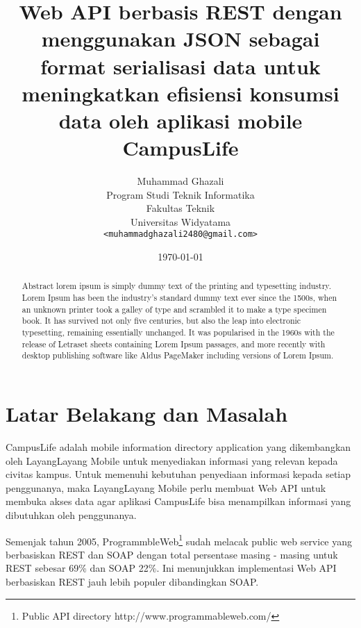 \documentclass[a4paper, 12pt]{report}
\title{\textbf{Web API berbasis REST dengan menggunakan JSON sebagai format serialisasi data untuk meningkatkan efisiensi konsumsi data oleh aplikasi mobile CampusLife}}
\author{
Muhammad Ghazali\\
Program Studi Teknik Informatika\\
Fakultas Teknik\\
Universitas Widyatama
\\ \texttt{<muhammadghazali2480@gmail.com>}
}
\date{\today}
\begin{document}
\maketitle

\tableofcontents
\setcounter{tocdepth}{3}

\listoffigures
\listoftables

\begin{abstract}
Abstract lorem ipsum is simply dummy text of the printing and typesetting industry. Lorem Ipsum has been the industry's standard dummy text ever since the 1500s, when an unknown printer took a galley of type and scrambled it to make a type specimen book. It has survived not only five centuries, but also the leap into electronic typesetting, remaining essentially unchanged. It was popularised in the 1960s with the release of Letraset sheets containing Lorem Ipsum passages, and more recently with desktop publishing software like Aldus PageMaker including versions of Lorem Ipsum.
\end{abstract}

\section*{Latar Belakang dan Masalah}
CampusLife adalah mobile information directory application yang dikembangkan oleh LayangLayang Mobile untuk menyediakan informasi yang relevan kepada civitas kampus. Untuk memenuhi kebutuhan penyediaan informasi kepada setiap penggunanya, maka LayangLayang Mobile perlu membuat Web API untuk membuka akses data agar aplikasi CampusLife bisa menampilkan informasi yang dibutuhkan oleh penggunanya.

Semenjak tahun 2005, ProgrammbleWeb\footnote{Public API directory http://www.programmableweb.com/} sudah melacak public web service yang berbasiskan REST dan SOAP dengan total persentase masing - masing untuk REST sebesar 69\% dan SOAP 22\%. Ini menunjukkan implementasi Web API berbasiskan REST jauh lebih populer dibandingkan SOAP.\cite{programmableweb-apis}
\end{document}
